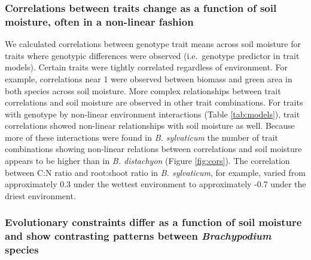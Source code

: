 \documentclass[jou,floatsintext]{apa6}
\begin{document}
\hypertarget{correlations-between-traits-change-as-a-function-of-soil-moisture-often-in-a-non-linear-fashion}{%
\subsubsection{Correlations between traits change as a function of soil moisture, often in a non-linear fashion}\label{correlations-between-traits-change-as-a-function-of-soil-moisture-often-in-a-non-linear-fashion}}

We calculated correlations between genotype trait means across soil moisture for traits where genotypic differences were observed (i.e.~genotype predictor in trait models). Certain traits were tightly correlated regardless of environment. For example, correlations near 1 were observed between biomass and green area in both species across soil moisture. More complex relationships between trait correlations and soil moisture are observed in other trait combinations. For traits with genotype by non-linear environment interactions (Table \ref{tab:models}), trait correlations showed non-linear relationships with soil moisture as well. Because more of these interactions were found in \emph{B. sylvaticum} the number of trait combinations showing non-linear relations between correlations and soil moisture appears to be higher than in \emph{B. distachyon} (Figure \ref{fig:cors}). The correlation between C:N ratio and root:shoot ratio in \emph{B. sylvaticum}, for example, varied from approximately 0.3 under the wettest environment to approximately -0.7 under the driest environment.

\hypertarget{evolutionary-constraints-differ-as-a-function-of-soil-moisture-and-show-contrasting-patterns-between-brachypodium-species}{%
\subsubsection{\texorpdfstring{Evolutionary constraints differ as a function of soil moisture and show contrasting patterns between \emph{Brachypodium} species}{Evolutionary constraints differ as a function of soil moisture and show contrasting patterns between Brachypodium species}}\label{evolutionary-constraints-differ-as-a-function-of-soil-moisture-and-show-contrasting-patterns-between-brachypodium-species}}
\end{document}
